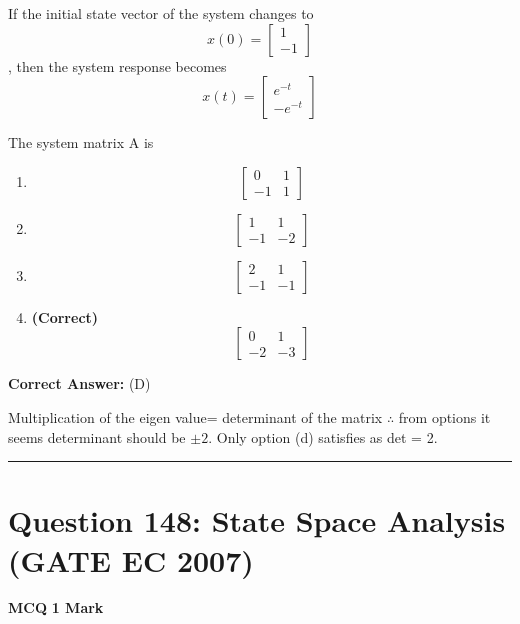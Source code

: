 \documentclass[11pt,a4paper]{article}
\begin{document}
 If the initial state vector of the system changes to 
\[
x(0)=\begin{bmatrix} 1\\ -1 \end{bmatrix}
\]
, then the system response becomes  
\[
x(t)=\begin{bmatrix} e^{-t}\\ -e^{-t} \end{bmatrix}
\]
 

The system matrix A is


\begin{enumerate}[label=(\Alph*)]
    \item \[
\begin{bmatrix} 0 & 1\\ -1&1 \end{bmatrix}
\]
    \item \[
\begin{bmatrix} 1 & 1\\ -1&-2 \end{bmatrix}
\]
    \item \[
\begin{bmatrix} 2 & 1\\ -1&-1 \end{bmatrix}
\]
    \item \textbf{(Correct)} \[
\begin{bmatrix} 0 & 1\\ -2&-3 \end{bmatrix}
\]
\end{enumerate}

\noindent \textbf{Correct Answer:} (D)

\begin{tcolorbox}[solbox, title=Detailed Solution -- Question 147]
Multiplication of the eigen value= determinant of
the matrix
$\therefore$  from options it seems determinant should be $\pm  2.$  Only option (d) satisfies as det = 2.
\end{tcolorbox}

\vspace{1.5em}
\hrule
\vspace{1.5em}

\section*{Question 148: State Space Analysis (GATE EC 2007)}
\noindent \textbf{\color{primary}MCQ} \hfill \textbf{\color{secondary}1 Mark}
\end{document}
